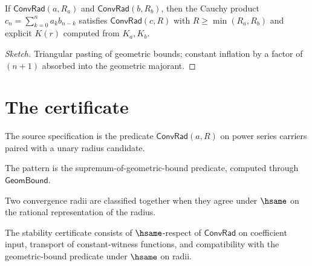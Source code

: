 \begin{lemma}
\label{lem:cauchy-product-radius}
If \(\mathsf{ConvRad}(a, R_a)\) and \(\mathsf{ConvRad}(b, R_b)\), then the Cauchy product \(c_n = \sum_{k=0}^n a_k b_{n-k}\) satisfies \(\mathsf{ConvRad}(c, R)\) with \(R \geq \min(R_a, R_b)\) and explicit \(K(r)\) computed from \(K_a, K_b\).
\end{lemma}
\begin{proof}[Sketch]
Triangular pasting of geometric bounds; constant inflation by a factor of \((n+1)\) absorbed into the geometric majorant.
\end{proof}

\section{The certificate}

\begin{definition}
\label{def:conv-rad-source-spec}
The source specification is the predicate \(\mathsf{ConvRad}(a, R)\) on power series carriers paired with a unary radius candidate.
\end{definition}

\begin{definition}
\label{def:conv-rad-pattern-spec}
The pattern is the supremum-of-geometric-bound predicate, computed through \(\mathsf{GeomBound}\).
\end{definition}

\begin{definition}
\label{def:conv-rad-classifier-spec}
Two convergence radii are classified together when they agree under \(\hsame\) on the rational representation of the radius.
\end{definition}

\begin{definition}
\label{def:conv-rad-stability-cert}
The stability certificate consists of \(\hsame\)-respect of \(\mathsf{ConvRad}\) on coefficient input, transport of constant-witness functions, and compatibility with the geometric-bound predicate under \(\hsame\) on radii.
\end{definition}

